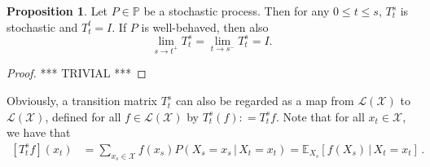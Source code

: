 \documentclass[10pt]{paper}
\theoremstyle{definition}
\newtheorem{proposition}[theorem]{Proposition}
\newtheorem{lemma}[theorem]{Lemma}
\newcommand{\reals}{\mathbb{R}}
\newcommand{\realsnonneg}{\reals_{\geq 0}}
\newcommand{\states}{\mathcal{X}}
\newcommand{\processes}{\mathbb{P}}
\newcommand{\mprocesses}{\processes^{\mathrm{M}}}
\newcommand{\gambles}{\mathcal{L}}
\newcommand{\gamblesX}{\gambles(\states)}
\newcommand{\coloneqq}{:\!=}
\begin{document}
\begin{proposition}\label{prop:stochasticprocess:simpleproperties}
Let $P\in\processes$ be a stochastic process. Then for any $0\leq t\leq s$, $T_t^s$ is stochastic and $T_t^t=I$. If $P$ is well-behaved, then also
\begin{equation}\label{eq:wellbehavedtransitionmatrix}
\lim_{s\to t^{+}}T_t^s=\lim_{t\to s^{-}}T_t^s=I.
\end{equation}
\end{proposition}
\begin{proof}
*** TRIVIAL ***
\end{proof}

Obviously, a transition matrix $T_t^s$ can also be regarded as a map from $\gamblesX$ to $\gamblesX$, defined for all $f\in\gamblesX$ by $T_t^s(f)\coloneqq T_t^sf$. Note that for all $x_t\in\states$, we have that
\begin{align*}
\left[T_t^sf\right](x_t) &= \sum_{x_s\in\states}f(x_s)P(X_s=x_s\,\vert\,X_t=x_t)
= \mathbb{E}_{X_s}\left[f(X_s)\,\vert\,X_t=x_t\right]\,.
\end{align*}




\end{document}

